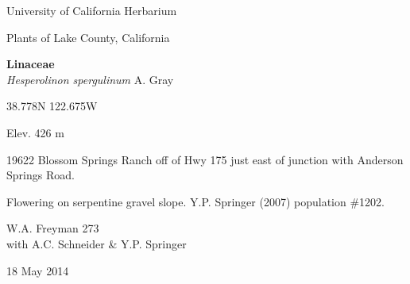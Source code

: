 \documentclass[letterpaper,10pt]{article}
\begin{document}
\begin{minipage}[t]{0.40\textwidth}

\begin{center}
University of California Herbarium \\
\begin{large}
Plants of Lake County, California \\
\end{large}
\vspace{\baselineskip}
\textbf{Linaceae} \\
\textit{Hesperolinon spergulinum} A. Gray\\
\end{center}

\begin{footnotesize}

\begin{multicols}{2}
38.778\textdegree N 122.675\textdegree W
\columnbreak
\begin{flushright}
Elev. 426 m
\end{flushright}
\end{multicols}

19622 Blossom Springs Ranch off of Hwy 175 just east of junction with Anderson Springs Road.
\vspace{\baselineskip}

Flowering on serpentine gravel slope. Y.P. Springer (2007) population \#1202.

\begin{multicols}{2}
W.A. Freyman 273 \\
with A.C. Schneider \& Y.P. Springer
\columnbreak
\begin{flushright}
18 May 2014
\end{flushright}
\end{multicols}

\end{footnotesize}

\end{minipage}
%
\hspace{2cm}
%
\end{document}
